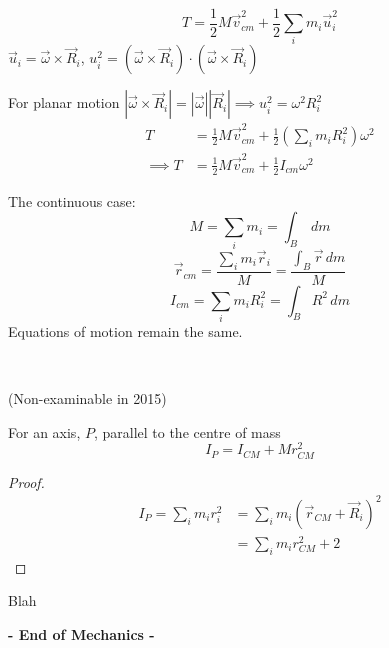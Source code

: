 ~
\[T = \frac{1}{2}M\vec{v}_{cm}^2 + \frac{1}{2}\sum_im_i\vec{u}_i^2\]
$\vec{u}_i = \vec{\omega} \times \vec{R}_i$, $u_i^ 2 = (\vec{\omega}\times\vec{R}_i) \cdot (\vec{\omega}\times\vec{R}_i)$

For planar motion $|\vec{\omega}\times\vec{R}_i| = |\vec{\omega}||\vec{R}_i| \implies u_i^2 = \omega^2R_i^2$
\[\begin{aligned}T &= \frac{1}{2}M\vec{v}_{cm}^2 + \frac{1}{2}\left(\sum_im_i{R}_i^2\right)\omega^2\\
\implies 	T &= \frac{1}{2}M\vec{v}_{cm}^2 + \frac{1}{2}I_{cm}\omega^2
\end{aligned}
\]
\begin{definition}
The continuous case:
\[M = \sum_i m_i = \int_B \,dm\]
\[\vec{r}_{cm} = \frac{\sum_i m_i\vec{r}_i}{M} = \frac{\int_B\vec{r}\,dm}{M}\]
\[I_{cm} = \sum_i m_iR_i^2 =  \int_B R^2\,dm\]
Equations of motion remain the same.
\end{definition}~

\begin{example}
	\vspace*{50pt}
\end{example}




(Non-examinable in 2015)
\begin{theorem}
For an axis, $P$, parallel to the centre of mass	\[I_P = I_{CM} + Mr^2_{CM}\]
\end{theorem}
\begin{proof}
\[\begin{aligned}I_P = \sum_{i} m_ir_i^2 &= \sum_i m_i(\vec{r}_{CM} + \vec{R}_i)^2\\
&= \sum_i m_i r_{CM}^2 + 2	
\end{aligned}
\]
\end{proof}

\begin{example}
	Blah
\end{example}






  \begin{center}
  \textsf{\textbf{- End of Mechanics -}}	
  \end{center}
  
  



